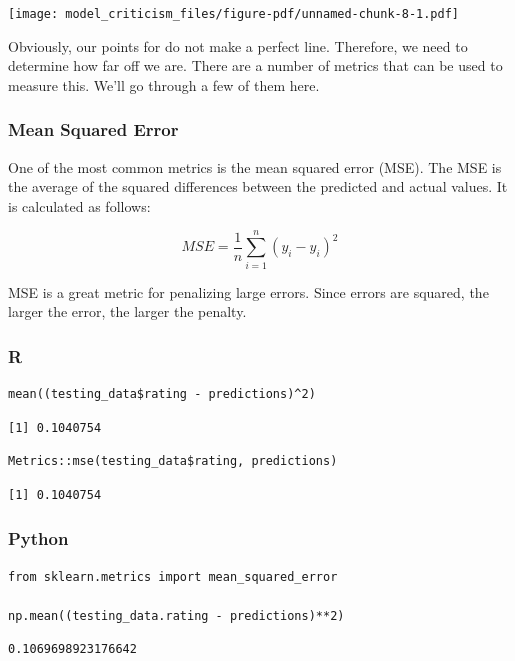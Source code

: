 \documentclass[
  letterpaper,
]{krantz}
\begin{document}
\texttt{[image: model\_criticism\_files/figure-pdf/unnamed-chunk-8-1.pdf]}

Obviously, our points for do not make a perfect line. Therefore, we need
to determine how far off we are. There are a number of metrics that can
be used to measure this. We'll go through a few of them here.

\subsubsection{Mean Squared Error}\label{sec-knowing-metrics-mse}

One of the most common metrics is the mean squared error (MSE). The MSE
is the average of the squared differences between the predicted and
actual values. It is calculated as follows:

\[MSE = \frac{1}{n}\sum_{i=1}^{n}(y_i - \hat{y}_i)^2\]

MSE is a great metric for penalizing large errors. Since errors are
squared, the larger the error, the larger the penalty.

\subsubsection{R}

\begin{verbatim}
mean((testing_data$rating - predictions)^2)
\end{verbatim}

\begin{verbatim}
[1] 0.1040754
\end{verbatim}

\begin{verbatim}
Metrics::mse(testing_data$rating, predictions)
\end{verbatim}

\begin{verbatim}
[1] 0.1040754
\end{verbatim}

\subsubsection{Python}

\begin{verbatim}
from sklearn.metrics import mean_squared_error

np.mean((testing_data.rating - predictions)**2)
\end{verbatim}

\begin{verbatim}
0.1069698923176642
\end{verbatim}
\end{document}
